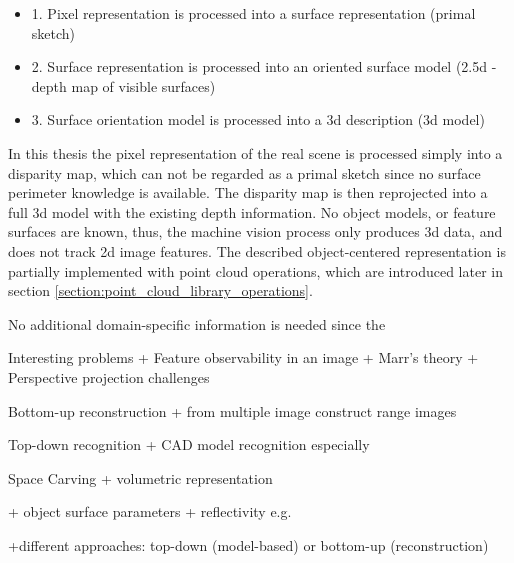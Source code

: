 \documentclass[12pt,a4paper,oneside,pdftex]{report}
\begin{document}
{\begin{itemize}
\label{list:objectcenteredmodeling}
\setlength{\itemsep}{0pt}
\item 1. Pixel representation is processed into a surface representation (primal sketch)
\item 2. Surface representation is processed into an oriented surface model (2.5d - depth map of visible surfaces)
\item 3. Surface orientation model is processed into a 3d description (3d model)
\end{itemize}

\cite{Sonka07}

In this thesis the pixel representation of the real scene is processed simply into a disparity map, which can not be regarded as a primal sketch since no surface perimeter knowledge is available. The disparity map is then reprojected into a full 3d model with the existing depth information. No object models, or feature surfaces are known, thus, the machine vision process only produces 3d data, and does not track 2d image features. The described object-centered representation is partially implemented with point cloud operations, which are introduced later in section \ref{section:point_cloud_library_operations}.





























No additional domain-specific information is needed since the 

Interesting problems
+ Feature observability in an image
+ Marr's theory
+ Perspective projection challenges

Bottom-up reconstruction
    + from multiple image construct range images

Top-down recognition
    + CAD model recognition especially

Space Carving
    + volumetric representation


+ object surface parameters
    + reflectivity e.g.
    
    
+different approaches: top-down (model-based) or bottom-up (reconstruction)


}
\end{document}
